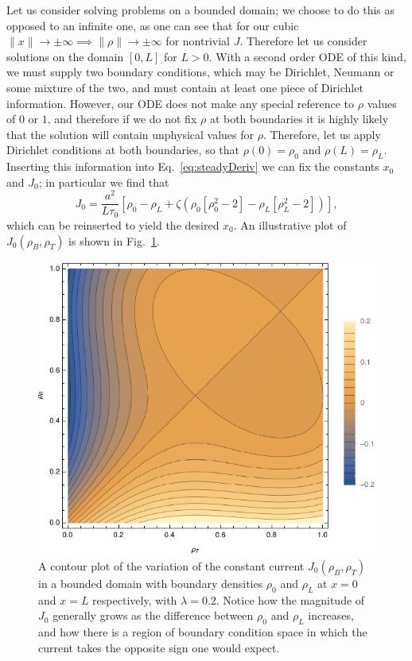 Let us consider solving problems on a bounded domain; we choose to do this as opposed to an infinite one, as one can see that for our cubic $ \|x\|  \rightarrow \pm \infty \implies \|\rho\|  \rightarrow \pm \infty$ for nontrivial $J$.
Therefore let us consider solutions on the domain $[0, L]$ for $L>0$. With a second order ODE of this kind, we must supply two boundary conditions, which may be Dirichlet, Neumann or some mixture of the two,
and must contain at least one piece of Dirichlet information. However, our ODE does not make any special reference to $\rho$ values of $0$ or $1$, and therefore if we do not fix $\rho$ at both boundaries it is highly likely that the solution will contain
unphysical values for $\rho$. Therefore, let us apply Dirichlet conditions at both boundaries, so that $\rho(0) = \rho_0$ and $\rho(L) = \rho_L$. Inserting this information into Eq.~\ref{eq:steadyDeriv} we can fix the constants
$x_0$ and $J_0$; in particular we find that
\begin{equation}
\label{eq:blockFlow}
  J_0 = \frac{a^2}{L \tau_0} \left[ \rho_0 - \rho_L + \zeta \left( \rho_0\left[\rho_0^2-2\right] - \rho_L\left[\rho_L^2-2\right] \right) \right],
\end{equation}
which can be reinserted to yield the desired $x_0$. An illustrative plot of $J_0(\rho_B, \rho_T)$ is shown in Fig.~\ref{fig:boundaryCurrent}.
\begin{figure}[h!]
 \caption[The variation in the current at fixed $\lambda$ with respect to the boundary densities.]{\label{fig:boundaryCurrent} A contour plot of the variation of the constant current $J_0(\rho_B, \rho_T)$ in a bounded domain with boundary densities $\rho_0$ and $\rho_L$ at $x=0$ and $x=L$ respectively,  with $\lambda=0.2$.
 Notice how the magnitude of $J_0$ generally grows as the difference between $\rho_0$ and $\rho_L$ increases, and how there is a region of boundary condition space in which the current takes the opposite sign one would expect.}
 \includegraphics[width=0.99\linewidth]{analytics/images/boundaryCurrent}
\end{figure}

